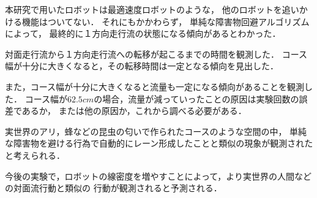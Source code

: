 本研究で用いたロボットは最適速度ロボット\cite{yamada19}のような，
他のロボットを追いかける機能はついてない．
それにもかかわらず，
単純な障害物回避アルゴリズムによって，
最終的に１方向走行流の状態になる傾向があるとわかった．

対面走行流から１方向走行流への転移が起こるまでの時間を観測した．
コース幅が十分に大きくなると，その転移時間は一定となる傾向を見出した．

また，コース幅が十分に大きくなると流量も一定になる傾向があることを観測した．
コース幅が$62.5cm$の場合，流量が減っていったことの原因は実験回数の誤差であるか，
または他の原因か，これから調べる必要がある．

実世界のアリ，蜂などの昆虫の匂いで作られたコースのような空間の中，
単純な障害物を避ける行為で自動的にレーン形成したことと類似の現象が観測されたと考えられる．

今後の実験で，ロボットの線密度を増やすことによって，より実世界の人間などの対面流行動と類似の
行動が観測されると予測される．

